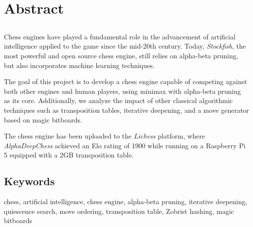 \chapter*{Abstract}

\section*{\tituloPortadaEngVal}

Chess engines have played a fundamental role in the advancement of artificial intelligence applied to the game since the mid-20th century. Today, \textit{Stockfish}, the most powerful and open source chess engine, still relies on alpha-beta pruning, but also incorporates machine learning techniques.

\vspace{1em}

\noindent The goal of this project is to develop a chess engine capable of competing against both other engines and human players, using minimax with alpha-beta pruning as its core. Additionally, we analyze the impact of other classical algorithmic techniques such as transposition tables, iterative deepening, and a move generator based on magic bitboards.

\vspace{1em}

The chess engine has been uploaded to the \textit{Lichess} platform, where \textit{AlphaDeepChess} achieved an Elo rating of 1900 while running on a Raspberry Pi 5 equipped with a 2GB transposition table.

\section*{Keywords}

\noindent chess, artificial intelligence, chess engine, alpha-beta pruning, iterative deepening, quiescence search, move ordering, transposition table, Zobrist hashing, magic bitboards
